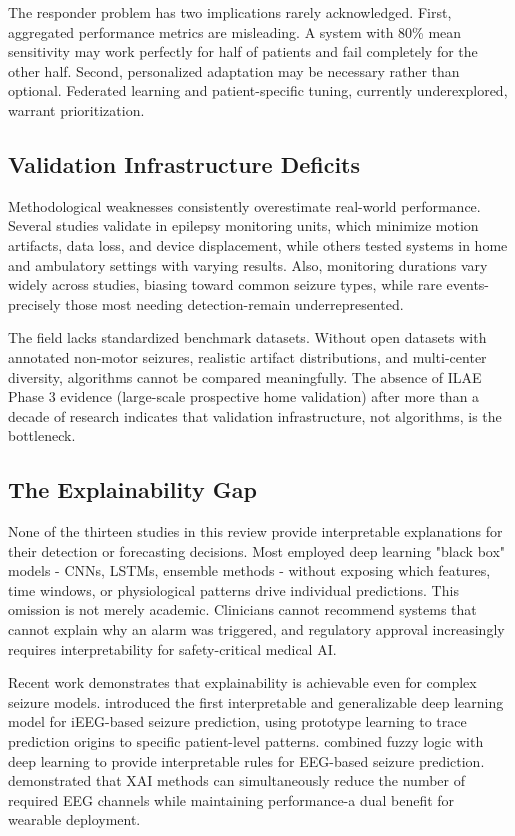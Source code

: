 The responder problem has two implications rarely acknowledged. First, aggregated performance metrics are misleading. A system with 80\% mean sensitivity may work perfectly for half of patients and fail completely for the other half. Second, personalized adaptation may be necessary rather than optional. Federated learning and patient-specific tuning, currently underexplored, warrant prioritization.

\subsection{Validation Infrastructure Deficits}

Methodological weaknesses consistently overestimate real-world performance. Several studies validate in epilepsy monitoring units, which minimize motion artifacts, data loss, and device displacement, while others tested systems in home and ambulatory settings with varying results. Also, monitoring durations vary widely across studies, biasing toward common seizure types, while rare events-precisely those most needing detection-remain underrepresented.

The field lacks standardized benchmark datasets. Without open datasets with annotated non-motor seizures, realistic artifact distributions, and multi-center diversity, algorithms cannot be compared meaningfully. The absence of ILAE Phase 3 evidence (large-scale prospective home validation) after more than a decade of research indicates that validation infrastructure, not algorithms, is the bottleneck.

\subsection{The Explainability Gap}

None of the thirteen studies in this review provide interpretable explanations for their detection or forecasting decisions. Most employed deep learning "black box" models - CNNs, LSTMs, ensemble methods - without exposing which features, time windows, or physiological patterns drive individual predictions. This omission is not merely academic. Clinicians cannot recommend systems that cannot explain why an alarm was triggered, and regulatory approval increasingly requires interpretability for safety-critical medical AI.

Recent work demonstrates that explainability is achievable even for complex seizure models. \parencite{gaoInterpretableGeneralizableDeep2024} introduced the first interpretable and generalizable deep learning model for iEEG-based seizure prediction, using prototype learning to trace prediction origins to specific patient-level patterns. \parencite{khanExplainableFuzzyDeep2024} combined fuzzy logic with deep learning to provide interpretable rules for EEG-based seizure prediction. \parencite{vieiraUsingExplainableArtificial2023} demonstrated that XAI methods can simultaneously reduce the number of required EEG channels while maintaining performance-a dual benefit for wearable deployment.

